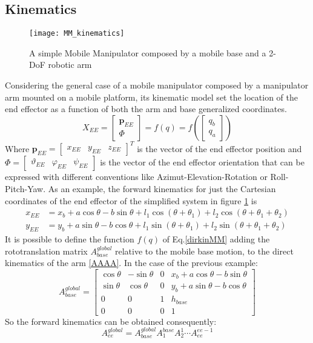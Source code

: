 \subsection{Kinematics}
\begin{figure}
\centering
\texttt{[image: MM\_kinematics]}
\label{MM_kin}
\caption{A simple Mobile Manipulator composed by a mobile base and a 2-DoF robotic arm}
\end{figure}
Considering the general case of a mobile manipulator composed by a manipulator arm mounted on a mobile platform, its kinematic model set the location of the end effector as a function of both the arm and base generalized coordinates.
\begin{equation}\label{dirkinMM}
	X_{EE}=\left[\begin{matrix}\mathbf{p}_{EE}\\\Phi\end{matrix}\right]=f(q)=f\left(\left[\begin{matrix}q_b\\q_a \end{matrix}\right]\right)
\end{equation}
Where $\mathbf{p}_{EE}=\left[\begin{matrix}x_{EE}&y_{EE}&z_{EE}\end{matrix}\right]^T$ is the vector of the end effector position and$\Phi =\left[\begin{matrix}\vartheta_{EE}&\varphi_{EE}&\psi_{EE}\end{matrix}\right]$ is the vector of the end effector orientation that can be expressed with different conventions like Azimut-Elevation-Rotation or Roll-Pitch-Yaw. As an example, the forward kinematics for just the Cartesian coordinates of the end effector of the simplified system in figure \ref{MM_kin} is
\begin{equation*}
\begin{split}
	x_{EE}&=x_b+a\cos\theta-b\sin\theta+l_1\cos\left(\theta+\theta_1\right)+l_2\cos\left(\theta+\theta_1+\theta_2\right)\\
	y_{EE}&=y_b+a\sin\theta-b\cos\theta+l_1\sin\left(\theta+\theta_1\right)+l_2\sin\left(\theta+\theta_1+\theta_2\right)
\end{split}
\end{equation*}
It is possible to define the function $f(q)$ of Eq.\ref{dirkinMM} adding the rototranslation matrix $A_{base}^{global}$ relative to the mobile base motion, to the direct kinematics of the arm \ref{AAAA}. In the case of the previous example:
\begin{equation}
	A_{base}^{global}=\left[\begin{matrix}
		\cos\theta&-\sin\theta&0&x_b+a\cos\theta-b\sin\theta\\
		\sin\theta&\cos\theta&0&y_b+a\sin\theta-b\cos\theta\\
		0&0&1&h_{base}\\
		0&0&0&1
	\end{matrix}\right]
\end{equation}
So the forward kinematics can be obtained consequently:
\begin{equation}
A_{ee}^{global}=A_{base}^{global}A_1^{base}A_2^1\cdots A_{ee}^{ee-1}
\end{equation}
